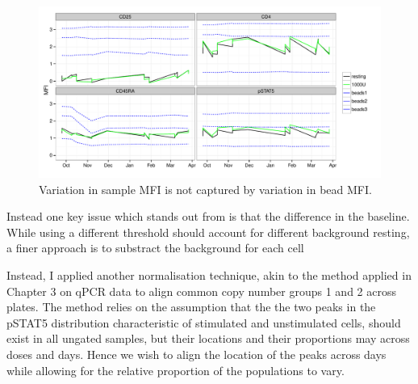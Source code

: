 \begin{figure}[h]
    \centering
    \includegraphics[scale=.5]{IL2/figures/beads.pdf}
    {Variation in sample MFI is not captured by variation in bead MFI.}
    { }
\end{figure}

Instead one key issue which stands out from  is that the difference in the baseline.
While using a different threshold should account for different background resting, a finer approach is to substract the background for each cell

Instead, I applied another normalisation technique, akin to the method applied in Chapter 3 on qPCR data to align common copy number groups 1 and 2 across plates.
The method relies on the assumption that the the two peaks in the pSTAT5 distribution characteristic of stimulated and unstimulated cells,
should exist in all ungated samples, but their locations and their proportions may across doses and days.
Hence we wish to align the location of the peaks across days while allowing for the relative proportion of the populations to vary.  


